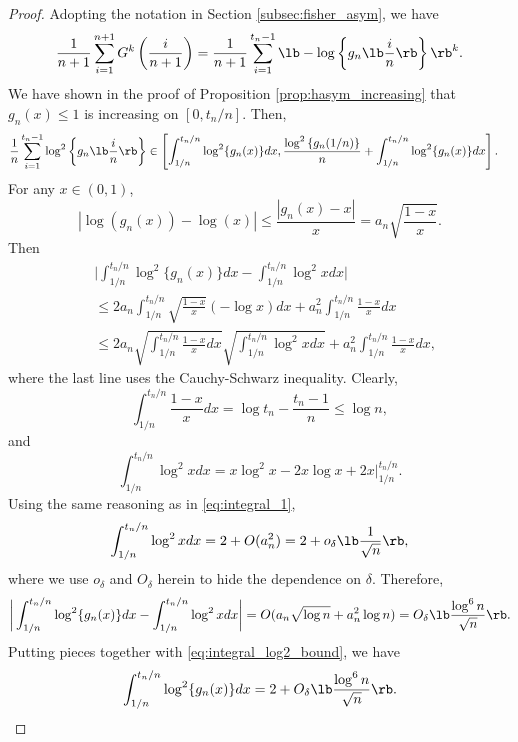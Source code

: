 \begin{proof}
Adopting the notation in Section \ref{subsec:fisher_asym}, we have
  \[\frac{1}{n+1}\sum_{i=1}^{n+1}G^k\left(\frac{i}{n+1}\right) = \frac{1}{n+1}\sum_{i=1}^{t_n - 1} \lb -\log \left\{g_n\lb\frac{i}{n}\rb\right\}\rb^{k}.\]
  We have shown in the proof of Proposition \ref{prop:hasym_increasing} that $g_n(x)\le 1$ is increasing on $[0, t_n / n]$. Then,
  \begin{align}
    &\frac{1}{n}\sum_{i=1}^{t_n - 1} \log^2 \left\{g_n\lb\frac{i}{n}\rb\right\} \in \left[\int_{1/n}^{t_n / n}\log^2 \{g_n(x)\}dx, \frac{\log^2\left\{g_n(1 / n)\right\}}{n} + \int_{1/n}^{t_n / n}\log^2 \{g_n(x)\}dx\right].    \label{eq:integral_log2_bound}
  \end{align}
  For any $x\in (0, 1)$,
  \[|\log(g_n(x)) - \log(x)|\le \frac{|g_n(x) - x|}{x} = a_{n}\sqrt{\frac{1 - x}{x}}.\]
  Then
  \begin{align*}
    &\bigg|\int_{1/n}^{t_n / n}\log^2 \{g_n(x)\}dx - \int_{1/n}^{t_n / n}\log^2 xdx\bigg|\\
    & \le 2a_n \int_{1/n}^{t_n / n} \sqrt{\frac{1-x}{x}}(-\log x) dx + a_n^2 \int_{1/n}^{t_n / n} \frac{1-x}{x} dx\\
    & \le 2a_{n}\sqrt{\int_{1/n}^{t_n / n} \frac{1-x}{x} dx}\sqrt{\int_{1/n}^{t_n / n} \log^2 x dx} + a_n^2 \int_{1/n}^{t_n / n} \frac{1-x}{x} dx,
  \end{align*}
  where the last line uses the Cauchy-Schwarz inequality. Clearly,
  \[\int_{1/n}^{t_n / n} \frac{1-x}{x} dx = \log t_n - \frac{t_n - 1}{n}\le \log n,\]
  and
  \[\int_{1/n}^{t_n / n} \log^2 x dx = x\log^2 x - 2x\log x + 2x\bigg|_{1/n}^{t_n/n}.\]
  Using the same reasoning as in \eqref{eq:integral_1},
  \begin{equation}
    \label{eq:log2x_integral}
    \int_{1/n}^{t_n / n} \log^2 x dx = 2 + O(a_n^2) = 2 + o_{\delta}\lb\frac{1}{\sqrt{n}}\rb,
  \end{equation}
  where we use $o_{\delta}$ and $O_{\delta}$ herein to hide the dependence on $\delta$. Therefore,
  \begin{align*}
    \bigg|\int_{1/n}^{t_n / n}\log^2 \{g_n(x)\}dx - \int_{1/n}^{t_n / n}\log^2 xdx\bigg| = O(a_n \sqrt{\log n} + a_n^2\log n) = O_{\delta}\lb\frac{\log^6 n}{\sqrt{n}}\rb.
  \end{align*}
    Putting pieces together with \eqref{eq:integral_log2_bound}, we have
    \begin{align*}
   \int_{1/n}^{t_n / n}\log^2 \{g_n(x)\}dx = 2 + O_{\delta}\lb\frac{\log^6 n}{\sqrt{n}}\rb.

\end{align*}
\end{proof}
